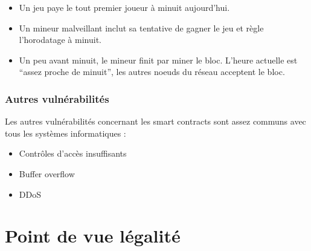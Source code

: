 \documentclass[12pt, a4paper, oneside]{book}
\begin{document}
    \begin{itemize}
        \item Un jeu paye le tout premier joueur à minuit aujourd'hui.
        \item Un mineur malveillant inclut sa tentative de gagner le jeu et règle l'horodatage à minuit.
        \item Un peu avant minuit, le mineur finit par miner le bloc. L'heure actuelle est \hyphenquote{french}{assez proche de minuit}, les autres noeuds du réseau acceptent le bloc.
    \end{itemize}

    \subsection{Autres vulnérabilités}

    Les autres vulnérabilités concernant les smart contracts sont assez communs avec tous les systèmes informatiques :

    \begin{itemize}
        \item Contrôles d'accès insuffisants
        \item Buffer overflow
        \item DDoS
    \end{itemize}



    \chapter{Point de vue légalité}
\end{document}
